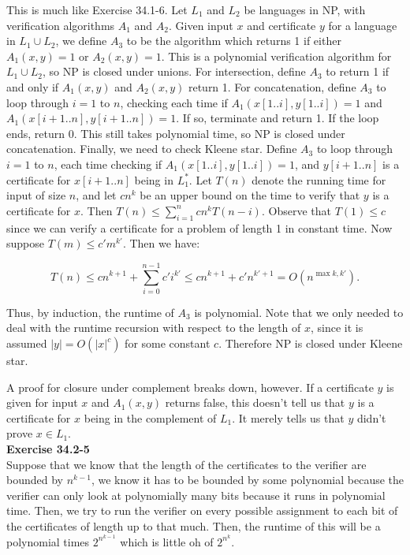 \documentclass{article}
\begin{document}
This is much like Exercise 34.1-6.  Let $L_1$ and $L_2$ be languages in NP, with verification algorithms $A_1$ and $A_2$.  Given input $x$ and certificate $y$ for a language in $L_1 \cup L_2$, we define $A_3$ to be the algorithm which returns 1 if either $A_1(x,y) = 1$ or $A_2(x,y) = 1$. This is a polynomial verification algorithm for $L_1 \cup L_2$, so NP is closed under unions. For intersection, define $A_3$ to return 1 if and only if $A_1(x,y)$ and $A_2(x,y)$ return 1.  For concatenation, define $A_3$ to loop through $i=1$ to $n$, checking each time if $A_1(x[1..i], y[1..i]) = 1$ and $A_1(x[i+1..n],y[i+1..n])=1$.  If so, terminate and return 1. If the loop ends, return 0.  This still takes polynomial time, so NP is closed under concatenation.  Finally, we need to check Kleene star.  Define $A_3$ to loop through $i=1$ to $n$, each time checking if $A_1(x[1..i], y[1..i]) = 1$, and $y[i+1..n]$ is a certificate for $x[i+1..n]$ being in $L_1^*$.  Let $T(n)$ denote the running time for input of size $n$, and let $cn^k$ be an upper bound on the time to verify that $y$ is a certificate for $x$.  Then $T(n) \leq \sum_{i=1}^n cn^k T(n-i)$.  Observe that $T(1) \leq c$ since we can verify a certificate for a problem of length 1 in constant time.  Now suppose $T(m) \leq c'm^{k'}$.  Then we have:

\[ T(n) \leq cn^{k+1} + \sum_{i=0}^{n-1} c'i^{k'} \leq cn^{k+1} + c'n^{k'+1} = O(n^{\max{k, k'}}).\]

Thus, by induction, the runtime of $A_3$ is polynomial.  Note that we only needed to deal with the runtime recursion with respect to the length of $x$, since it is assumed $|y| = O(|x|^c)$ for some constant $c$.  Therefore NP is closed under Kleene star. 

A proof for closure under complement breaks down, however.  If a certificate $y$ is given for input $x$ and $A_1(x,y)$ returns false, this doesn't tell us that $y$ is a certificate for $x$ being in the complement of $L_1$.  It merely tells us that $y$ didn't prove $x \in L_1$. \\

\noindent\textbf{Exercise 34.2-5}\\

Suppose that we know that the length of the certificates to the verifier are bounded by $n^{k-1}$, we know it has to be bounded by some polynomial because the verifier can only look at polynomially many bits because it runs in polynomial time. Then, we try to run the verifier on every possible assignment to each bit of the certificates of length up to that much. Then, the runtime of this will be a polynomial times $2^{n^{k-1}}$ which is little oh of $2^{n^k}$.\\
\end{document}
